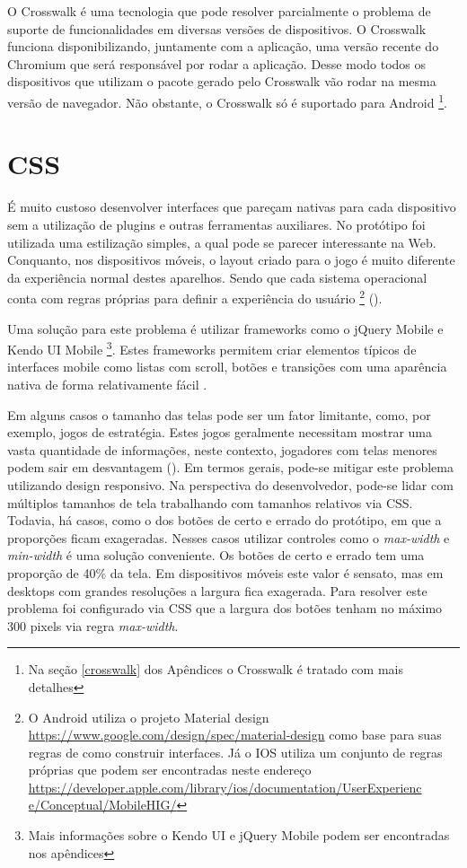 O Crosswalk é uma tecnologia que pode resolver parcialmente o problema
de suporte de funcionalidades em diversas versões de dispositivos.
O Crosswalk funciona disponibilizando, juntamente com a aplicação,
uma versão recente do Chromium que será responsável por rodar a
aplicação. Desse modo todos os dispositivos que utilizam o pacote
gerado pelo Crosswalk vão rodar na mesma versão de navegador. Não
obstante, o Crosswalk só é suportado para Android \footnote{Na
seção \ref{crosswalk} dos Apêndices o Crosswalk é tratado com mais
detalhes}.

\section{CSS}

É muito custoso desenvolver interfaces que pareçam nativas
para cada dispositivo sem a utilização de plugins e outras
ferramentas auxiliares. No protótipo foi utilizada uma estilização
simples, a qual pode se parecer interessante na Web. Conquanto, nos
dispositivos móveis, o layout criado para o jogo é muito diferente
da experiência normal destes aparelhos. Sendo que cada sistema
operacional conta com regras próprias para definir a experiência
do usuário \footnote{ O Android utiliza o projeto Material design
\url{https://www.google.com/design/spec/material-design} como base
para suas regras de como construir interfaces. Já o IOS utiliza um
conjunto de regras próprias que podem ser encontradas neste endereço
\url{https://developer.apple.com/library/ios/documentation/UserExperienc
e/Conceptual/MobileHIG/}} ().

Uma solução para este problema é utilizar frameworks como o jQuery
Mobile e Kendo UI Mobile \footnote{Mais informações sobre o Kendo UI
e jQuery Mobile podem ser encontradas nos apêndices}. Estes frameworks
permitem criar elementos típicos de interfaces mobile como listas
com scroll, botões e transições com uma aparência nativa de forma
relativamente fácil \autocite{publishHtml5}.

Em alguns casos o tamanho das telas pode ser um fator limitante,
como, por exemplo, jogos de estratégia. Estes jogos geralmente
necessitam mostrar uma vasta quantidade de informações, neste
contexto, jogadores com telas menores podem sair em desvantagem
().
Em termos gerais, pode-se mitigar este problema utilizando design
responsivo. Na perspectiva do desenvolvedor, pode-se lidar com
múltiplos tamanhos de tela trabalhando com tamanhos relativos via
CSS. Todavia, há casos, como o dos botões de certo e errado
do protótipo, em que a proporções ficam exageradas. Nesses casos
utilizar controles como o \textit{max-width} e \textit{min-width} é uma
solução conveniente. Os botões de certo e errado tem uma proporção
de 40\% da tela. Em dispositivos móveis este valor é sensato, mas
em desktops com grandes resoluções a largura fica exagerada. Para
resolver este problema foi configurado via CSS que a largura dos botões
tenham no máximo 300 pixels via regra \textit{max-width}.

